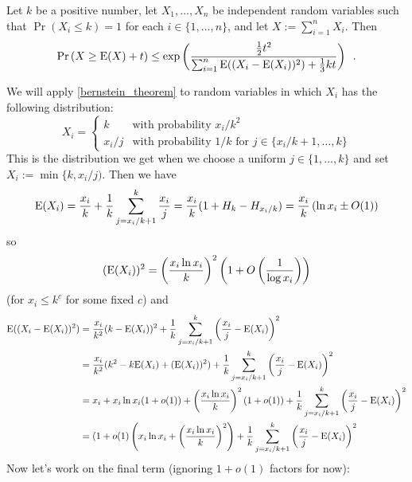\documentclass{patmorin}
\begin{document}
\begin{thm}\label{bernstein_theorem}
  Let $k$ be a positive number, let $X_1,\ldots,X_n$ be independent random variables such that $\Pr(X_i\le k)=1$ for each $i\in\{1,\ldots,n\}$, and let $X:=\sum_{i=1}^n X_i$. Then
  \begin{equation}
    \Pr\left(X \ge \mathrm{E}(X)+ t\right)
      \le \exp\left(\frac{\tfrac{1}{2}t^2}{\sum_{i=1}^n \mathrm{E}((X_i-\mathrm{E}(X_i))^2)+\tfrac{1}{3}kt}\right) \enspace . \label{bernstein}
  \end{equation}
\end{thm}
We will apply \cref{bernstein_theorem} to random variables in which $X_i$ has the following distribution:
\[
  X_i = \begin{cases}
          k & \text{with probability $x_i/k^2$} \\
          x_i/j & \text{with probability $1/k$ for $j\in\{x_i/k+1,\ldots,k\}$}
        \end{cases}
\]
This is the distribution we get when we choose a uniform $j\in\{1,\ldots,k\}$ and set $X_i:=\min\{k,x_i/j)$.
Then we have
\[
  \mathrm{E}(X_i)=\frac{x_i}{k} + \frac{1}{k}\sum_{j=x_i/k+1}^k \frac{x_i}{j}
  = \frac{x_i}{k}(1+H_{k}-H_{x_i/k}) = \frac{x_i}{k}\left(\ln x_i \pm O(1) \right)
\]
so
\[
  (\mathrm{E}(X_i))^2 = \left(\frac{x_i\ln x_i}{k}\right)^2\left(1+O\left(\frac{1}{\log x_i}\right)\right)
\]
(for $x_i\le k^c$ for some fixed $c$)
and
\begin{align*}
  \mathrm{E}((X_i-\mathrm{E}(X_i))^2)
  & = \frac{x_i}{k^2}(k-\mathrm{E}(X_i))^2
    + \frac{1}{k}\sum_{j=x_i/k+1}^k \left(\frac{x_i}{j}-\mathrm{E}(X_i)\right)^2 \\
  & = \frac{x_i}{k^2}(k^2-k\mathrm{E}(X_i)+(\mathrm{E}(X_i))^2)
    + \frac{1}{k}\sum_{j=x_i/k+1}^k \left(\frac{x_i}{j}-\mathrm{E}(X_i)\right)^2 \\
  & = x_i + x_i\ln x_i(1+o(1)) + \left(\frac{x_i\ln x_i}{k}\right)^2(1+o(1))
    + \frac{1}{k}\sum_{j=x_i/k+1}^k \left(\frac{x_i}{j}-\mathrm{E}(X_i)\right)^2 \\
  & = (1+o(1)\left(x_i\ln x_i + \left(\frac{x_i\ln x_i}{k}\right)^2\right)
    + \frac{1}{k}\sum_{j=x_i/k+1}^k \left(\frac{x_i}{j}-\mathrm{E}(X_i)\right)^2
\end{align*}
Now let's work on the final term (ignoring $1+o(1)$ factors for now):
\end{document}
